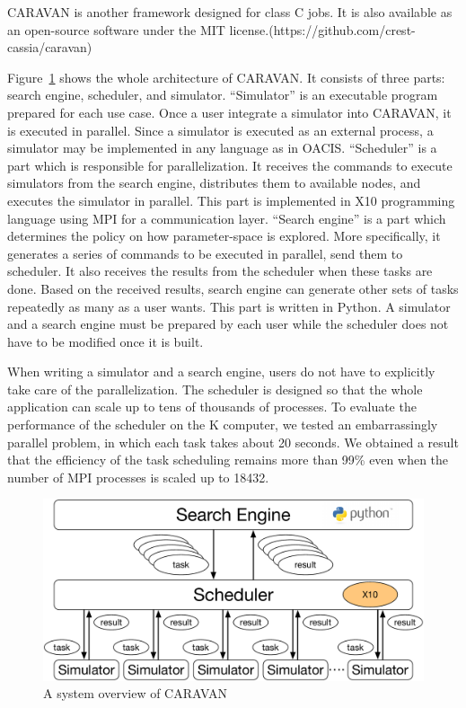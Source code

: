 CARAVAN is another framework designed for class C jobs.
It is also available as an open-source software under the MIT license.(https://github.com/crest-cassia/caravan)

Figure~\ref{fig:caravan_overview} shows the whole architecture of CARAVAN. It consists of three parts: search engine, scheduler, and simulator.
``Simulator'' is an executable program prepared for each use case. Once a user integrate a simulator into CARAVAN, it is executed in parallel.
Since a simulator is executed as an external process, a simulator may be implemented in any language as in OACIS.
``Scheduler'' is a part which is responsible for parallelization. It receives the commands to execute simulators from the search engine, distributes them to available nodes, and executes the simulator in parallel.
This part is implemented in X10 programming language using MPI for a communication layer.
``Search engine'' is a part which determines the policy on how parameter-space is explored.
More specifically, it generates a series of commands to be executed in parallel, send them to scheduler.
It also receives the results from the scheduler when these tasks are done.
Based on the received results, search engine can generate other sets of tasks repeatedly as many as a user wants.
This part is written in Python.
A simulator and a search engine must be prepared by each user while the scheduler does not have to be modified once it is built.

When writing a simulator and a search engine, users do not have to explicitly take care of the parallelization.
The scheduler is designed so that the whole application can scale up to tens of thousands of processes.
To evaluate the performance of the scheduler on the K computer, we tested an embarrassingly parallel problem, in which each task takes about 20 seconds.
We obtained a result that the efficiency of the task scheduling remains more than 99\% even when the number of MPI processes is scaled up to 18432.

\begin{figure}
  \centering
  \includegraphics[width=.8\linewidth]{Figs.murase/caravan_overview.pdf}
  \caption{A system overview of CARAVAN}
  \label{fig:caravan_overview}
\end{figure}

